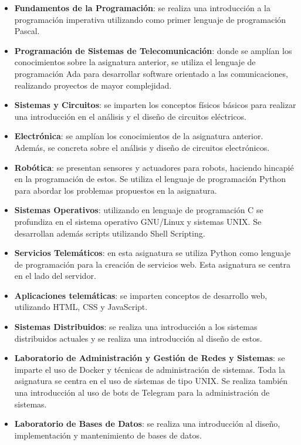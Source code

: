 \documentclass[a4paper, 12pt, oneside]{book}
\begin{document}
\begin{itemize}
\item \textbf{Fundamentos de la Programación}: se realiza una introducción a la programación imperativa utilizando como primer lenguaje de programación Pascal.

\item \textbf{Programación de Sistemas de Telecomunicación}: donde se amplían los conocimientos sobre la asignatura anterior, se utiliza el lenguaje de programación Ada para desarrollar software orientado a las comunicaciones, realizando proyectos de mayor complejidad.

\item \textbf{Sistemas y Circuitos}: se imparten los conceptos físicos básicos para realizar una introducción en el análisis y el diseño de circuitos eléctricos.

\item \textbf{Electrónica}: se amplían los conocimientos de la asignatura anterior. Además, se concreta sobre el análisis y diseño de circuitos electrónicos.

\item \textbf{Robótica}: se presentan sensores y actuadores para robots, haciendo hincapié en la programación de estos. Se utiliza el lenguaje de programación Python para abordar los problemas propuestos en la asignatura.

\item \textbf{Sistemas Operativos}: utilizando en lenguaje de programación C se profundiza en el sistema operativo GNU/Linux y sistemas UNIX. Se desarrollan además scripts utilizando Shell Scripting.

\item \textbf{Servicios Telemáticos}: en esta asignatura se utiliza Python como lenguaje de programación para la creación de servicios web. Esta asignatura se centra en el lado del servidor.

\item \textbf{Aplicaciones telemáticas}: se imparten conceptos de desarrollo web, utilizando HTML, CSS y JavaScript.

\item \textbf{Sistemas Distribuidos}: se realiza una introducción a los sistemas distribuidos actuales y se realiza una introducción al diseño de estos.

\item \textbf{Laboratorio de Administración y Gestión de Redes y Sistemas}: se imparte el uso de Docker y técnicas de administración de sistemas. Toda la asignatura se centra en el uso de sistemas de tipo UNIX. Se realiza también una introducción al uso de bots de Telegram para la administración de sistemas.

\item \textbf{Laboratorio de Bases de Datos}: se realiza una introducción al diseño, implementación y mantenimiento de bases de datos.

\end{itemize}
 
\end{document}
